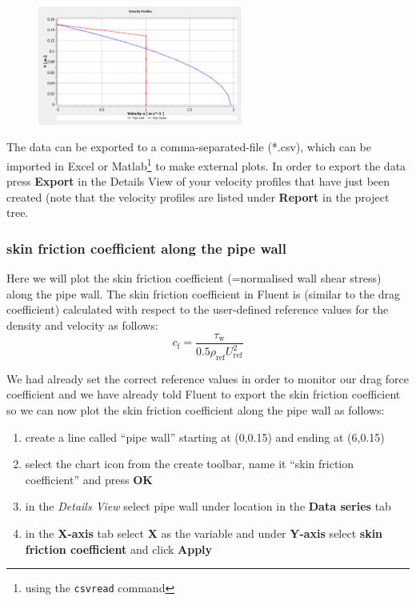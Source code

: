 \documentclass[11pt,a4paper,oneside]{scrartcl}
\newcommand\bfr[1]{\textcolor[rgb]{1,0.00,0.00}{\textbf{\textsf{#1}}}}
\begin{document}
\begin{figure}[H]
\begin{center}
\includegraphics[width=0.6\textwidth,clip]{velocity_profiles.png}
\end{center}
\end{figure}

The data can be exported to a comma-separated-file (*.csv), which can be imported in Excel or Matlab\footnote{using the \texttt{csvread} command} to make external plots. In order to export the data press \bfr{Export} in the Details View of your velocity profiles that have just been created (note that the velocity profiles are listed under  \bfr{Report} in the project tree.

\subsubsection{skin friction coefficient along the pipe wall}
Here we will plot the skin friction coefficient (=normalised wall shear stress) along the pipe wall. The skin friction coefficient in Fluent is (similar to the drag coefficient) calculated with respect to the user-defined reference values for the density and velocity as follows:
\begin{equation}
    c_\mathrm{f}=\frac{\tau_\mathrm{w}}{0.5\rho_\mathrm{ref}U^2_\mathrm{ref}}
\end{equation}

We had already set the correct reference values in order to monitor our drag force coefficient and we have already told Fluent to export the skin friction coefficient so we can now plot the skin friction coefficient along the pipe wall as follows:
\begin{enumerate}
\item create a line called ``pipe wall'' starting at (0,0.15) and ending at (6,0.15)
\item select the chart icon from the create toolbar, name it ``skin friction coefficient'' and press \bfr{OK}
\item in the \emph{Details View} select pipe wall under location in the \bfr{Data series} tab
\item in the \bfr{X-axis} tab select \bfr{X} as the variable and under \bfr{Y-axis} select \bfr{skin friction coefficient} and click \bfr{Apply}
\end{enumerate}
\end{document}
